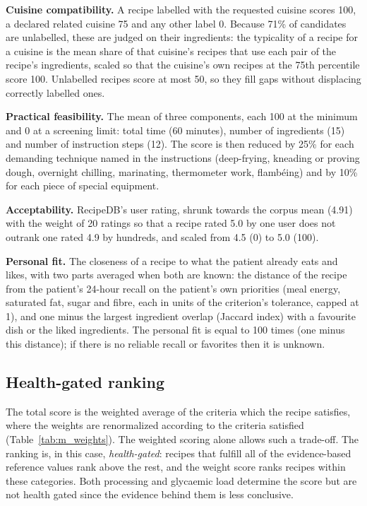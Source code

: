 \textbf{Cuisine compatibility.} A recipe labelled with the requested cuisine
scores 100, a declared related cuisine 75 and any other label 0. Because 71\%
of candidates are unlabelled, these are judged on their ingredients: the
typicality of a recipe for a cuisine is the mean share of that cuisine's
recipes that use each pair of the recipe's ingredients, scaled so that the
cuisine's own recipes at the 75th percentile score 100. Unlabelled recipes
score at most 50, so they fill gaps without displacing correctly labelled
ones.

\textbf{Practical feasibility.} The mean of three components, each 100 at the
minimum and 0 at a screening limit: total time (60 minutes), number of
ingredients (15) and number of instruction steps (12). The score is then
reduced by 25\% for each demanding technique named in the instructions
(deep-frying, kneading or proving dough, overnight chilling, marinating,
thermometer work, flamb\'eing) and by 10\% for each piece of special
equipment.

\textbf{Acceptability.} RecipeDB's user rating, shrunk towards the corpus
mean (4.91) with the weight of 20 ratings so that a recipe rated 5.0 by one
user does not outrank one rated 4.9 by hundreds, and scaled from 4.5 (0) to
5.0 (100).

\textbf{Personal fit.} The closeness of a recipe to what the patient already
eats and likes, with two parts averaged when both are known: the distance of
the recipe from the patient's 24-hour recall on the patient's own priorities
(meal energy, saturated fat, sugar and fibre, each in units of the
criterion's tolerance, capped at 1), and one minus the largest ingredient
overlap (Jaccard index) with a favourite dish or the liked ingredients.
The personal fit is equal to 100 times (one minus this distance); 
if there is no reliable recall or favorites then it is unknown. 
\subsection{Health-gated ranking}

The total score is the weighted average of the criteria which the recipe satisfies, 
where the weights are renormalized according to the criteria satisfied (Table~\ref{tab:m_weights}). 
The weighted scoring alone allows such a trade-off. The ranking is, in this case, 
\emph{health-gated}: recipes that fulfill all of the evidence-based reference values 
rank above the rest, and the weight score ranks recipes within these categories. Both 
processing and glycaemic load determine the score but are not 
health gated since the evidence behind them is less conclusive.

